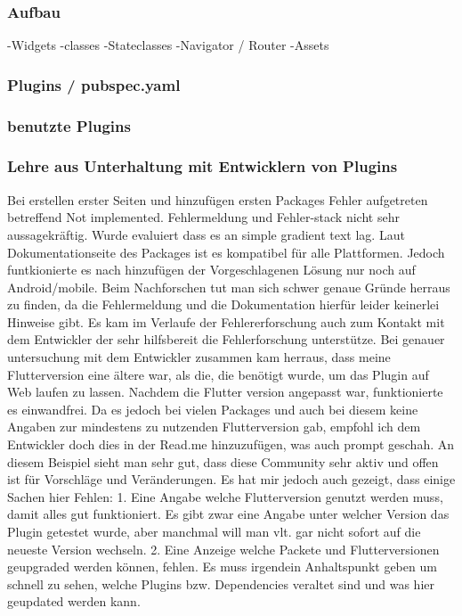 \subsubsection{Aufbau}
-Widgets
-classes
-Stateclasses
-Navigator / Router
-Assets

\subsubsection{Plugins / pubspec.yaml}
\subsubsection{benutzte Plugins}
\subsubsection{Lehre aus Unterhaltung mit Entwicklern von Plugins}
Bei erstellen erster Seiten und hinzufügen ersten Packages Fehler aufgetreten betreffend Not implemented. Fehlermeldung und Fehler-stack nicht sehr aussagekräftig. Wurde evaluiert dass es an simple gradient text lag. Laut Dokumentationseite des Packages ist es kompatibel für alle Plattformen. Jedoch funtkionierte es nach hinzufügen der Vorgeschlagenen Lösung nur noch auf Android/mobile. Beim Nachforschen tut man sich schwer genaue Gründe herraus zu finden, da die Fehlermeldung und die Dokumentation hierfür leider keinerlei Hinweise gibt. 
Es kam im Verlaufe der Fehlererforschung auch zum Kontakt mit dem Entwickler der sehr hilfsbereit die Fehlerforschung unterstütze.
Bei genauer untersuchung mit dem Entwickler zusammen kam herraus, dass meine Flutterversion eine ältere war, als die, die benötigt wurde, um das Plugin auf Web laufen zu lassen. Nachdem die Flutter version angepasst war, funktionierte es einwandfrei. Da es jedoch bei vielen Packages und auch bei diesem keine Angaben zur mindestens zu nutzenden Flutterversion gab, empfohl ich dem Entwickler doch dies in der Read.me hinzuzufügen, was auch prompt geschah. 
An diesem Beispiel sieht man sehr gut, dass diese Community sehr aktiv und offen ist für Vorschläge und Veränderungen.
Es hat mir jedoch auch gezeigt, dass einige Sachen hier Fehlen:
1. Eine Angabe welche Flutterversion genutzt werden muss, damit alles gut funktioniert. Es gibt zwar eine Angabe unter welcher Version das Plugin getestet wurde, aber manchmal will man vlt. gar nicht sofort auf die neueste Version wechseln.
2. Eine Anzeige welche Packete und Flutterversionen geupgraded werden können, fehlen. Es muss irgendein Anhaltspunkt geben um schnell zu sehen, welche Plugins bzw. Dependencies veraltet sind und was hier geupdated werden kann.


